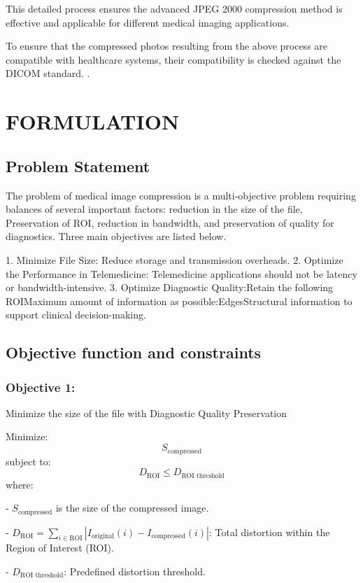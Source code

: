 \documentclass[conference,letterpaper]{IEEEtran}
\begin{document}
This detailed process ensures the advanced JPEG 2000 compression method is effective and applicable for different medical imaging applications.

To ensure that the compressed photos resulting from the above process are compatible with healthcare systems, their compatibility is checked against the DICOM standard. . 

\section{FORMULATION}
\subsection{ Problem Statement}

The problem of medical image compression is a multi-objective problem requiring balances of several important factors: reduction in the size of the file, Preservation of ROI, reduction in bandwidth, and preservation of quality for diagnostics. Three main objectives are listed below.

1. Minimize File Size: Reduce storage and transmission overheads.
2. Optimize the Performance in Telemedicine: Telemedicine applications should not be latency or bandwidth-intensive.
3. Optimize Diagnostic Quality:Retain the following ROIMaximum amount of information as possible:EdgesStructural information to support clinical decision-making.

\subsection{Objective function and constraints}

\subsubsection{Objective 1:}  Minimize the size of the file with Diagnostic Quality Preservation

Minimize:
\[
S_{\text{compressed}}
\]
    subject to:
\[
D_{\text{ROI}} \leq D_{\text{ROI threshold}}
\]
    where:

- \( S_{\text{compressed}} \) is the size of the compressed image.

- \( D_{\text{ROI}} = \sum_{i \in \text{ROI}} \left| I_{\text{original}}(i) - I_{\text{compressed}}(i) \right| \): Total                   distortion within the Region of Interest (ROI).

- \( D_{\text{ROI threshold}} \): Predefined distortion threshold.
\end{document}
